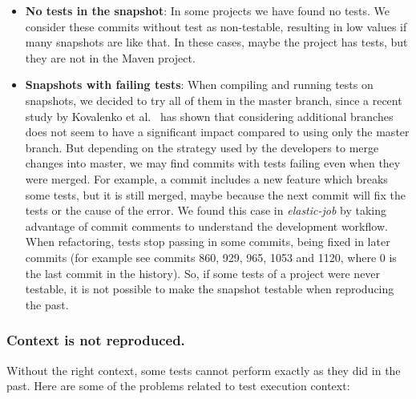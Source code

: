 \begin{itemize}
    \item  \textbf{No tests in the snapshot}: 
    In some projects we have found no tests. 
    We consider these commits without test as non-testable, resulting in low values if many snapshots are like that.
    In these cases, maybe the project has tests, but they are not in the Maven project.
    \item \textbf{Snapshots with failing tests}: 
    When compiling and running tests on snapshots, we decided to try all of them in the master branch, since a recent study by Kovalenko et al.~\cite{kovalenko:2018:miningfilehistories} has shown that considering additional branches does not seem to have a significant impact compared to using only the master branch. 
    But depending on the strategy used by the developers to merge changes into master, we may find commits with tests failing even when they were merged. 
    For example, a commit includes a new feature which breaks some tests, but it is still merged, maybe because the next commit will fix the tests or the cause of the error.
    We found this case in \textit{elastic-job} by taking advantage of commit comments to understand the development workflow. 
    When refactoring, tests stop passing in some commits, being fixed in later commits (for example see commits 860, 929, 965, 1053 and 1120, where 0 is the last commit in the history).
    So, if some tests of a project were never testable, it is not possible to make the snapshot testable when reproducing the past.
\end{itemize}

\subsubsection{Context is not reproduced.} 
Without the right context, some tests cannot perform exactly as they did in the past. Here are some of the problems related to test execution context:


